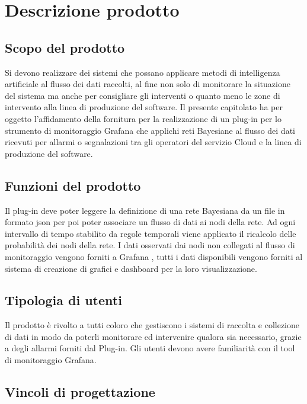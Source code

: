 \section{Descrizione prodotto}
		\subsection{Scopo del prodotto}			
Si devono realizzare dei sistemi che possano applicare metodi di intelligenza artificiale \pedice al flusso dei dati raccolti, al fine non solo di monitorare la situazione del sistema ma anche per consigliare gli interventi o quanto meno le zone di intervento alla linea di produzione del software.
Il presente capitolato ha per oggetto l'affidamento della fornitura per la
realizzazione di un plug-in per lo strumento di monitoraggio Grafana \pedice che
applichi reti Bayesiane \pedice al flusso dei dati ricevuti per allarmi o segnalazioni tra gli operatori del servizio Cloud e la linea di produzione del software.


		\subsection{Funzioni del prodotto}
Il plug-in deve poter leggere la definizione di una rete Bayesiana \pedice da un file in formato json per poi poter associare un flusso di dati ai nodi della rete. Ad ogni intervallo di tempo stabilito da regole temporali viene applicato il ricalcolo delle probabilità dei nodi della rete. I dati osservati dai nodi non collegati al flusso di monitoraggio vengono forniti a Grafana \pedice, tutti i dati disponibili vengono forniti al sistema di creazione di grafici e dashboard \pedice per la loro visualizzazione.


		\subsection{Tipologia di utenti}

Il prodotto è rivolto a tutti coloro che gestiscono i sistemi di raccolta e collezione di dati in modo da poterli monitorare ed intervenire qualora sia
necessario, grazie a degli allarmi forniti dal Plug-in.
Gli utenti devono avere familiarità  con il tool di monitoraggio Grafana.


		\subsection{Vincoli di progettazione}
